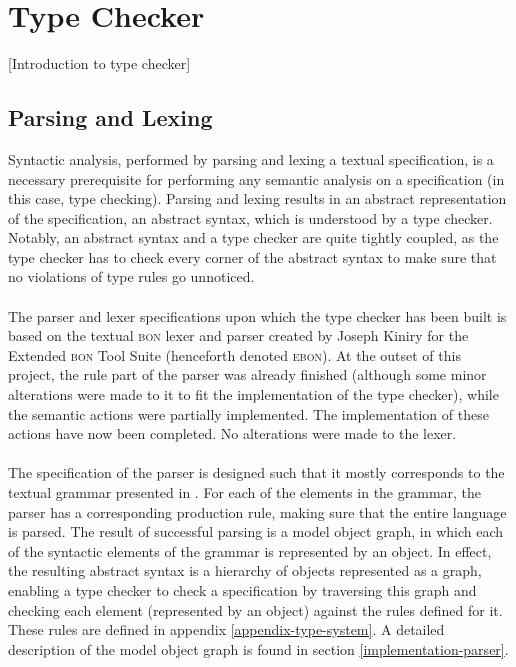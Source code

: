 \section{Type Checker}
[Introduction to type checker]
\subsection{Parsing and Lexing}
\label{design-parsing}
Syntactic analysis, performed by parsing and lexing a textual \bon{} specification, is a necessary prerequisite for performing any semantic analysis on a specification (in this case, type checking). Parsing and lexing results in an abstract representation of the specification, an abstract syntax, which is understood by a type checker. Notably, an abstract syntax and a type checker are quite tightly coupled, as the type checker has to check every corner of the abstract syntax to make sure that no violations of type rules go unnoticed.
\paragraph{}
The parser and lexer specifications upon which the type checker has been built is based on the textual \textsc{bon} lexer and parser created by Joseph Kiniry for the Extended \textsc{bon} Tool Suite \cite{ebon} (henceforth denoted \textsc{ebon}). At the outset of this project, the rule part of the parser was already finished (although some minor alterations were made to it to fit the implementation of the type checker), while the semantic actions were partially implemented. The implementation of these actions have now been completed. No alterations were made to the lexer.

\paragraph{}
The specification of the parser is designed such that it mostly corresponds to the textual \bon{} grammar presented in \cite{walden1995}. For each of the elements in the grammar, the parser has a corresponding production rule, making sure that the entire language is parsed. The result of successful parsing is a model object graph, in which each of the syntactic elements of the grammar is represented by an object. In effect, the resulting abstract syntax is a hierarchy of objects represented as a graph, enabling a type checker to check a \bon{} specification by traversing this graph and checking each element (represented by an object) against the rules defined for it. These rules are defined in appendix \ref{appendix-type-system}. A detailed description of the model object graph is found in section \ref{implementation-parser}.

